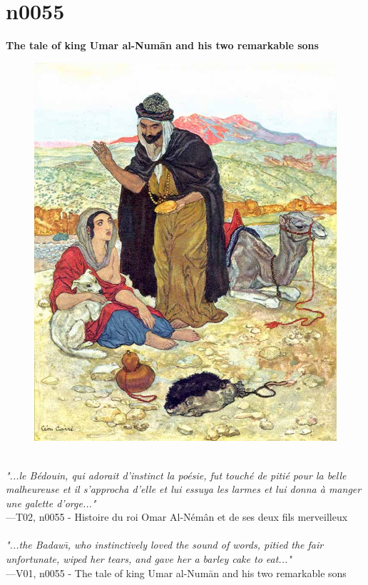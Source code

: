 \documentclass[../Carre_nights.tex]{subfiles}
\begin{document}
\newpage

\section{n0055}
\textbf{\Large{The tale of king Umar al-Num\=an and his two remarkable sons}} \\

\begin{figure}[ht]
\centering
\includegraphics[height=\figsize]{illustrations/volume_2/T02, n0055 - Histoire du roi Omar Al-Némân et de ses deux fils merveilleux.jpg}
\end{figure}

\textit{\\
"...le Bédouin, qui adorait d’instinct la poésie, fut touché de pitié pour la belle malheureuse et il s’approcha d’elle et lui essuya les larmes et lui donna à manger une galette d’orge..."} \\
—T02, n0055 - Histoire du roi Omar Al-Némân et de ses deux fils merveilleux \\~\\
\textit{"...the Badaw\={\i}, who instinctively loved the sound of words, pitied the fair unfortunate, wiped her tears, and gave her a barley cake to eat..."} \\
—V01, n0055 - The tale of king Umar al-Num\=an and his two remarkable sons
\end{document}
